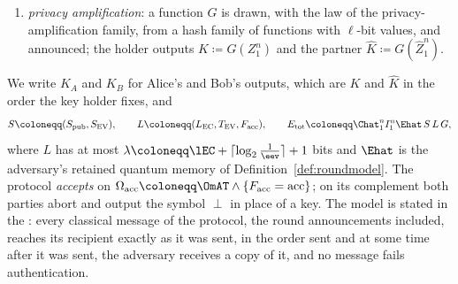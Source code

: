 \begin{definition}
\begin{enumerate}[label=(\roman*),leftmargin=2.4em]
\item \emph{privacy amplification}: a function $G$ is drawn, with the law of
  the privacy-amplification family, from a hash family of functions with
  $\ell$-bit values, and announced; the holder outputs
  $K\coloneqq G(Z_1^n)$ and the partner $\hat K\coloneqq G(\hat Z_1^n)$.
\end{enumerate}
We write $K_A$ and $K_B$ for Alice's and Bob's outputs, which are $K$ and
$\hat K$ in the order the key holder fixes, and
\begin{equation}\label{eq:pp-registers}
  S\coloneqq(S_{\mathrm{pub}},S_{\mathrm{EV}}),\qquad
  L\coloneqq(L_{\mathrm{EC}},T_{\mathrm{EV}},F_{\mathrm{acc}}),\qquad
  E_{\mathrm{tot}}\coloneqq\Chat_1^nI_1^n\Ehat\,S\,L\,G,
\end{equation}
where $L$ has at most
$\lambda\coloneqq\lEC+\lceil\log_2\frac1{\eev}\rceil+1$ bits and $\Ehat$ is
the adversary's retained quantum memory of Definition~\ref{def:roundmodel}.
The protocol \emph{accepts} on
$\Omega_{\mathrm{acc}}\coloneqq\OmAT\wedge\{F_{\mathrm{acc}}=\mathrm{acc}\}$;
on its complement both parties abort and output the symbol $\perp$ in place
of a key. The model is stated in the
:
every classical message of the protocol, the round announcements included,
reaches its recipient exactly as it was sent, in the order sent and at some
time after it was sent, the adversary receives a copy of it, and no message
fails authentication.
\end{definition}
